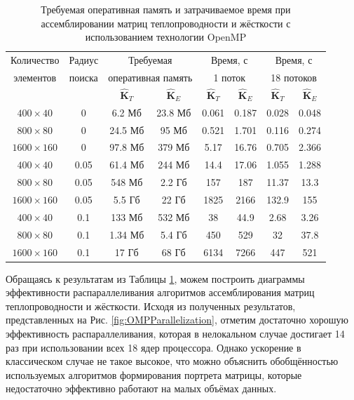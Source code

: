 \begin{table}[htbp]
    \centering
    \begin{threeparttable}%
        \caption{Требуемая оперативная память и затрачиваемое время при ассемблировании матриц теплопроводности и жёсткости с использованием технологии OpenMP}\label{tab:OpenMP}
        \begin{tabular}{|c|c|c|c|c|c|c|c|}
	\hline
	Количество & Радиус & \multicolumn{2}{c|}{Требуемая}   & \multicolumn{2}{c|}{Время, с} & \multicolumn{2}{c|}{Время, с} \\
	элементов  & поиска & \multicolumn{2}{c|}{оперативная память} & \multicolumn{2}{c|}{1 поток}  & \multicolumn{2}{c|}{18 потоков} \\
	\cline{3-8}
	      &        & $\widehat{\textbf{K}}_T$ & $\widehat{\textbf{K}}_E$ & $\widehat{\textbf{K}}_T$ & $\widehat{\textbf{K}}_E$ & $\widehat{\textbf{K}}_T$ & $\widehat{\textbf{K}}_E$ \\
	\hline
	$400 \times 40$   & 0    & 6.2 Мб  & 23.8 Мб & 0.061 & 0.187 & 0.028 & 0.048 \\
	\hline
	$800 \times 80$   & 0    & 24.5 Мб & 95 Мб   & 0.521 & 1.701 & 0.116 & 0.274 \\
	\hline
	$1600 \times 160$ & 0    & 97.8 Мб & 379 Мб  & 5.17  & 16.76 & 0.705 & 2.366 \\
	\hline
	$400 \times 40$   & 0.05 & 61.4 Мб & 244 Мб  & 14.4  & 17.06 & 1.055 & 1.288 \\
	\hline
	$800 \times 80$   & 0.05 & 548 Мб  & 2.2 Гб  & 157   & 187   & 11.37 & 13.3  \\
	\hline
	$1600 \times 160$ & 0.05 & 5.5 Гб  & 22 Гб   & 1825  & 2166  & 132.9 & 155   \\
	\hline
	$400 \times 40$   & 0.1  & 133 Мб  & 532 Мб  & 38    & 44.9  & 2.68  & 3.26  \\
	\hline
	$800 \times 80$   & 0.1  & 1.34 Мб & 5.4 Гб  & 450   & 529   & 32    & 37.8  \\
	\hline
	$1600 \times 160$ & 0.1  & 17 Гб   & 68 Гб   & 6134  & 7266  & 447   & 521   \\
	\hline
        \end{tabular}
    \end{threeparttable}
\end{table}

Обращаясь к результатам из Таблицы \ref{tab:OpenMP}, можем построить диаграммы эффективности распараллеливания алгоритмов ассемблирования матриц теплопроводности и жёсткости. Исходя из полученных результатов, представленных на Рис. \ref{fig:OMPParallelization}, отметим достаточно хорошую эффективность распараллеливания, которая в нелокальном случае достигает 14 раз при использовании всех 18 ядер процессора. Однако ускорение в классическом случае не такое высокое, что можно объяснить обобщённостью используемых алгоритмов формирования портрета матрицы, которые недостаточно эффективно работают на малых объёмах данных.

